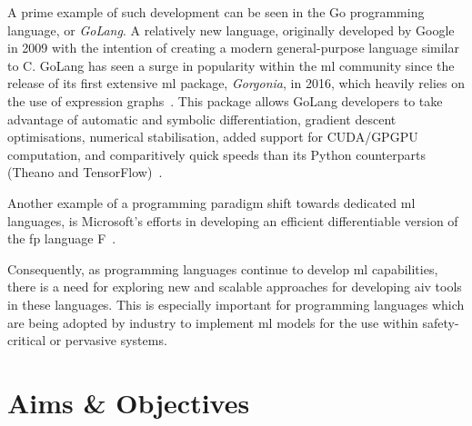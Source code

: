 
A prime example of such development can be seen in the Go programming language, or \textit{GoLang}. A relatively new language, originally developed by Google in 2009 with the intention
of creating a modern general-purpose language similar to C. 
GoLang has seen a surge in popularity within the \gls{ml} community since
the release of its first extensive \gls{ml} package, \textit{Gorgonia}, in 2016, which heavily relies on the use of expression graphs~\citep{chew2016}.
This package allows GoLang developers
to take advantage of automatic and symbolic differentiation, gradient descent optimisations, numerical stabilisation,
added support for CUDA/GPGPU computation, and comparitively quick speeds than its Python counterparts (Theano and TensorFlow)~\citep{golang2020}.

Another example of a programming paradigm shift towards dedicated \gls{ml} languages, is Microsoft's efforts in developing
an efficient differentiable version of the \Gls{fp} language F~\citep{shaikhha2019}.

Consequently, as programming languages continue to develop \gls{ml} capabilities, there is a need for 
exploring new and scalable approaches for developing \gls{aiv} tools in these languages.
This is especially important for programming languages which are being adopted by industry to implement \gls{ml} models
for the use within safety-critical or pervasive systems.

\section{Aims \& Objectives}






